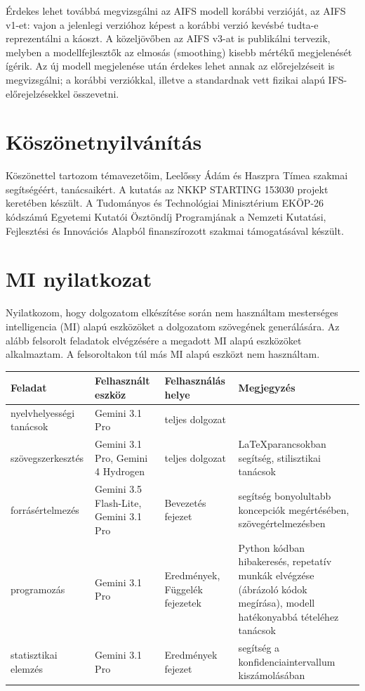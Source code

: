 \documentclass[12pt,a4paper]{article}
\begin{document}
Érdekes lehet továbbá megvizsgálni az AIFS modell korábbi verzióját, az AIFS v1-et: vajon a jelenlegi verzióhoz képest a korábbi verzió kevésbé tudta-e reprezentálni a káoszt. A közeljövőben az AIFS v3-at is publikálni tervezik, melyben a modellfejlesztők az elmosás (smoothing) kisebb mértékű megjelenését ígérik. Az új modell megjelenése után érdekes lehet annak az előrejelzéseit is megvizsgálni; a korábbi verziókkal, illetve a standardnak vett fizikai alapú IFS-előrejelzésekkel összevetni.


\section{Köszönetnyilvánítás}
Köszönettel tartozom témavezetőim, Leelőssy Ádám és Haszpra Tímea szakmai segítségéért, tanácsaikért. A kutatás az NKKP STARTING 153030 projekt keretében készült. A Tudományos és Technológiai Minisztérium EKÖP-26 kódszámú Egyetemi Kutatói Ösztöndíj Programjának a Nemzeti Kutatási, Fejlesztési és Innovációs Alapból finanszírozott szakmai támogatásával készült.

\section{MI nyilatkozat}
Nyilatkozom, hogy dolgozatom elkészítése során nem használtam mesterséges intelligencia (MI) alapú eszközöket a dolgozatom szövegének generálására. Az alább felsorolt feladatok elvégzésére a megadott MI alapú eszközöket alkalmaztam. A felsoroltakon túl más MI alapú eszközt nem használtam.

\begin{table}[H]
    \centering
    \small
    \begin{tabular}{|p{3cm}|p{4cm}|p{3.5cm}|p{4.5cm}|}\hline
       \textbf{Feladat}  & \textbf{Felhasznált eszköz} & \textbf{Felhasználás helye} & \textbf{Megjegyzés}\\\hline

        nyelvhelyességi tanácsok & Gemini 3.1 Pro & 
        teljes dolgozat & \\\hline

        szövegszerkesztés & Gemini 3.1 Pro, Gemini 4 Hydrogen & teljes dolgozat & \LaTeX   parancsokban segítség, stilisztikai tanácsok\\\hline

        forrásértelmezés & Gemini 3.5 Flash-Lite, Gemini 3.1 Pro & Bevezetés fejezet & segítség bonyolultabb koncepciók megértésében, szövegértelmezésben \\\hline

        programozás & Gemini 3.1 Pro & Eredmények, Függelék fejezetek & Python kódban hibakeresés, repetatív munkák elvégzése (ábrázoló kódok megírása), modell hatékonyabbá tételéhez tanácsok\\\hline

        statisztikai elemzés & Gemini 3.1 Pro & Eredmények fejezet & segítség a konfidenciaintervallum kiszámolásában \\\hline        
        
    \end{tabular}
\end{table}
\end{document}

